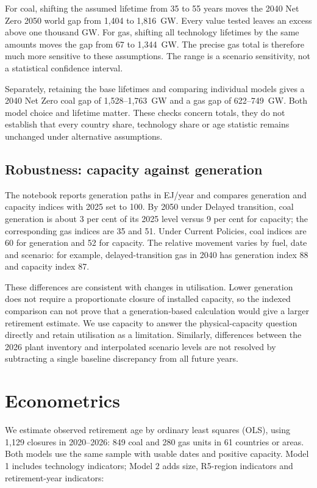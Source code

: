 \documentclass[11pt,a4paper]{article}
\begin{document}
For coal, shifting the assumed lifetime from 35 to 55 years moves the 2040 Net Zero 2050 world gap from 1,404 to 1,816~GW. Every value tested leaves an excess above one thousand GW. For gas, shifting all technology lifetimes by the same amounts moves the gap from 67 to 1,344~GW. The precise gas total is therefore much more sensitive to these assumptions. The range is a scenario sensitivity, not a statistical confidence interval.

Separately, retaining the base lifetimes and comparing individual models gives a 2040 Net Zero coal gap of 1,528--1,763~GW and a gas gap of 622--749~GW. Both model choice and lifetime matter. These checks concern totals, they do not establish that every country share, technology share or age statistic remains unchanged under alternative assumptions.

\subsection*{Robustness: capacity against generation}

The notebook reports generation paths in EJ/year and compares generation and capacity indices with 2025 set to 100. By 2050 under Delayed transition, coal generation is about 3 per cent of its 2025 level versus 9 per cent for capacity; the corresponding gas indices are 35 and 51. Under Current Policies, coal indices are 60 for generation and 52 for capacity. The relative movement varies by fuel, date and scenario: for example, delayed-transition gas in 2040 has generation index 88 and capacity index 87.

These differences are consistent with changes in utilisation. Lower generation does not require a proportionate closure of installed capacity, so the indexed comparison can not prove that a generation-based calculation would give a larger retirement estimate. We use capacity to answer the physical-capacity question directly and retain utilisation as a limitation. Similarly, differences between the 2026 plant inventory and interpolated scenario levels are not resolved by subtracting a single baseline discrepancy from all future years.

\section{Econometrics}

We estimate observed retirement age by ordinary least squares (OLS), using 1,129 closures in 2020--2026: 849 coal and 280 gas units in 61 countries or areas. Both models use the same sample with usable dates and positive capacity. Model 1 includes technology indicators; Model 2 adds size, R5-region indicators and retirement-year indicators:
\end{document}
